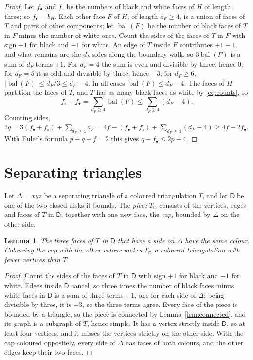 \documentclass[10pt]{amsart}
\numberwithin{equation}{section}
\newtheorem{lemma}[equation]{Lemma}
\theoremstyle{definition}
\theoremstyle{remark}
\newcommand{\T}{T}
\newcommand{\bal}{\operatorname{bal}}
\begin{document}
\begin{proof}
Let $f_\bullet$ and $f_\circ$ be the numbers of black and white faces of $H$ of length three; so $f_\bullet=b_H$.
Each other face $F$ of $H$, of length $d_F\ge4$, is a union of faces of $\T$ and parts of other components; let $\bal(F)$ be the number of black faces of $\T$ in $F$ minus the number of white ones.
Count the sides of the faces of $\T$ in $F$ with sign $+1$ for black and $-1$ for white.
An edge of $\T$ inside $F$ contributes $+1-1$, and what remains are the $d_F$ sides along the boundary walk, so $3\bal(F)$ is a sum of $d_F$ terms $\pm1$.
For $d_F=4$ the sum is even and divisible by three, hence $0$; for $d_F=5$ it is odd and divisible by three, hence $\pm3$; for $d_F\ge6$, $|\bal(F)|\le d_F/3\le d_F-4$.
In all cases $\bal(F)\le d_F-4$.
The faces of $H$ partition the faces of $\T$, and $\T$ has as many black faces as white by \eqref{eq:counts}, so
\[
f_\circ-f_\bullet=\sum_{d_F\ge4}\bal(F)\le\sum_{d_F\ge4}(d_F-4).
\]
Counting sides, $2q=3(f_\bullet+f_\circ)+\sum_{d_F\ge4}d_F=4f-(f_\bullet+f_\circ)+\sum_{d_F\ge4}(d_F-4)\ge4f-2f_\bullet$.
With Euler's formula $p-q+f=2$ this gives $q-f_\bullet\le 2p-4$.
\end{proof}

\FloatBarrier
\section{Separating triangles}\label{sec:glue}

Let $\Delta=xyz$ be a separating triangle of a coloured triangulation $\T$, and let $\mathsf{D}$ be one of the two closed disks it bounds.
The \emph{piece} $\T_{\mathsf{D}}$ consists of the vertices, edges and faces of $\T$ in $\mathsf{D}$, together with one new face, the \emph{cap}, bounded by $\Delta$ on the other side.

\begin{lemma}\label{lem:cap}
The three faces of $\T$ in $\mathsf{D}$ that have a side on $\Delta$ have the same colour.
Colouring the cap with the other colour makes $\T_{\mathsf{D}}$ a coloured triangulation with fewer vertices than $\T$.
\end{lemma}

\begin{proof}
Count the sides of the faces of $\T$ in $\mathsf{D}$ with sign $+1$ for black and $-1$ for white.
Edges inside $\mathsf{D}$ cancel, so three times the number of black faces minus white faces in $\mathsf{D}$ is a sum of three terms $\pm1$, one for each side of $\Delta$; being divisible by three, it is $\pm3$, so the three terms agree.
Every face of the piece is bounded by a triangle, so the piece is connected by Lemma~\ref{lem:connected}, and its graph is a subgraph of $\T$, hence simple.
It has a vertex strictly inside $\mathsf{D}$, so at least four vertices, and it misses the vertices strictly on the other side.
With the cap coloured oppositely, every side of $\Delta$ has faces of both colours, and the other edges keep their two faces.
\end{proof}
\end{document}
